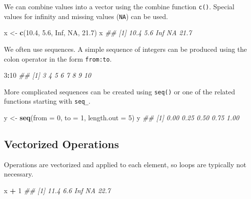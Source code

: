 \documentclass[
  notitlepage]{book}
\newenvironment{Shaded}{\begin{snugshade}}{\end{snugshade}}
\newcommand{\CommentTok}[1]{\textcolor[rgb]{0.56,0.35,0.01}{\textit{#1}}}
\newcommand{\DataTypeTok}[1]{\textcolor[rgb]{0.13,0.29,0.53}{#1}}
\newcommand{\DecValTok}[1]{\textcolor[rgb]{0.00,0.00,0.81}{#1}}
\newcommand{\FloatTok}[1]{\textcolor[rgb]{0.00,0.00,0.81}{#1}}
\newcommand{\KeywordTok}[1]{\textcolor[rgb]{0.13,0.29,0.53}{\textbf{#1}}}
\newcommand{\NormalTok}[1]{#1}
\newcommand{\OperatorTok}[1]{\textcolor[rgb]{0.81,0.36,0.00}{\textbf{#1}}}
\newcommand{\OtherTok}[1]{\textcolor[rgb]{0.56,0.35,0.01}{#1}}
\newcommand{\StringTok}[1]{\textcolor[rgb]{0.31,0.60,0.02}{#1}}
\begin{document}
We can combine values into a vector using the combine function \texttt{c()}.
Special values for infinity and missing values (\texttt{NA}) can be used.

\begin{Shaded}
\begin{Highlighting}[]
\NormalTok{x \textless{}{-}}\StringTok{ }\KeywordTok{c}\NormalTok{(}\FloatTok{10.4}\NormalTok{, }\FloatTok{5.6}\NormalTok{, }\OtherTok{Inf}\NormalTok{, }\OtherTok{NA}\NormalTok{, }\FloatTok{21.7}\NormalTok{)}
\NormalTok{x}
\CommentTok{\#\# [1] 10.4  5.6  Inf   NA 21.7}
\end{Highlighting}
\end{Shaded}

We often use sequences. A simple sequence of integers can be produced using
the colon operator in the form \texttt{from:to}.

\begin{Shaded}
\begin{Highlighting}[]
\DecValTok{3}\OperatorTok{:}\DecValTok{10}
\CommentTok{\#\# [1]  3  4  5  6  7  8  9 10}
\end{Highlighting}
\end{Shaded}

More complicated sequences can be created using \texttt{seq()} or one of
the related functions starting with \texttt{seq\_}.

\begin{Shaded}
\begin{Highlighting}[]
\NormalTok{y \textless{}{-}}\StringTok{ }\KeywordTok{seq}\NormalTok{(}\DataTypeTok{from =} \DecValTok{0}\NormalTok{, }\DataTypeTok{to =} \DecValTok{1}\NormalTok{, }\DataTypeTok{length.out =} \DecValTok{5}\NormalTok{)}
\NormalTok{y}
\CommentTok{\#\# [1] 0.00 0.25 0.50 0.75 1.00}
\end{Highlighting}
\end{Shaded}

\hypertarget{vectorized-operations}{%
\subsection{Vectorized Operations}\label{vectorized-operations}}

Operations are vectorized and applied to each element,
so loops are typically not necessary.

\begin{Shaded}
\begin{Highlighting}[]
\NormalTok{x }\OperatorTok{+}\StringTok{ }\DecValTok{1}
\CommentTok{\#\# [1] 11.4  6.6  Inf   NA 22.7}
\end{Highlighting}
\end{Shaded}
\end{document}
